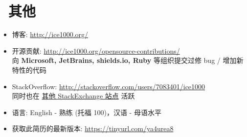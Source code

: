 \documentclass{resume}
\begin{document}
\section{\faInfo\ 其他}
\begin{itemize}[parsep=0.5ex]
  \item 博客: \url{http://ice1000.org/}
  \item 开源贡献: \url{http://ice1000.org/opensource-contributions/} \\
    向 \textbf{Microsoft, JetBrains, shields.io, Ruby} 等组织提交过修 bug / 增加新特性的代码
  \item StackOverflow: \url{http://stackoverflow.com/users/7083401/ice1000} \\
    同时也在 \href{https://stackexchange.com/users/9532102/ice1000} {其他 StackExchange 站点} 活跃
  \item 语言: English - 熟练 (托福 100)，汉语 - 母语水平
  \item 获取此简历的最新版本: \url{https://tinyurl.com/ya4urea8}
\end{itemize}

%
%
\end{document}
